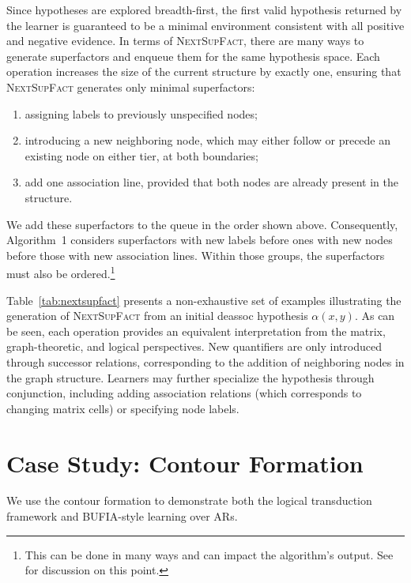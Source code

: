 Since hypotheses are explored breadth-first, the first valid hypothesis
returned by the learner is guaranteed to be a minimal environment
consistent with all positive and negative evidence. In terms of
\textsc{NextSupFact}, there are many ways to generate superfactors and
enqueue them for the same hypothesis space. Each operation increases the
size of the current structure by exactly one, ensuring that
\textsc{NextSupFact} generates only minimal superfactors:
\begin{enumerate}[label=(\roman*),noitemsep]
	\item assigning labels to previously unspecified nodes;
	\item introducing a new neighboring node, which may either follow or
	precede an existing node on either tier, at both boundaries;
	\item add one association line, provided that both nodes are already
	present in the structure.
\end{enumerate}
We add these superfactors to the queue in the order shown above.
Consequently, Algorithm~1 considers superfactors with new labels before
ones with new nodes before those with new association lines. Within
those groups, the superfactors must also be ordered.\footnote{This can
	be done in many ways and can impact the algorithm's output. See
	\citet{rawski2021structure} for discussion on this point.}

Table~\ref{tab:nextsupfact} presents a non-exhaustive set of examples
illustrating the generation of \textsc{NextSupFact} from an initial
\textsf{deassoc} hypothesis \(\alpha(x,y)\). As can be seen, each
operation provides an equivalent interpretation from the matrix,
graph-theoretic, and logical perspectives. New quantifiers are
only introduced through successor %
relations, corresponding to the addition of neighboring nodes in the
graph structure. Learners may further specialize the hypothesis through
conjunction, including adding association relations (which corresponds
to changing matrix cells) or specifying node labels.


\section{Case Study: Contour Formation}
We use the contour formation to demonstrate both the logical
transduction framework and BUFIA-style learning over ARs.

